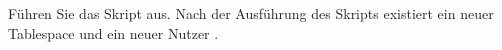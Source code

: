     \item Führen Sie das Skript 
    aus. Nach der Ausführung des Skripts existiert ein neuer Tablespace
     und ein neuer Nutzer .
